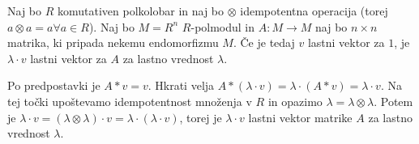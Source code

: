 \documentclass[mat1]{fmfdelo}
\newcommand{\pojem}[1]{\ensuremath{\emph{#1}}}
\newcommand{\map}[3]{\ensuremath{{#1}:{#2}\rightarrow{#3}}}
\begin{document}
\begin{trditev}
Naj bo $R$ komutativen polkolobar in naj bo $\otimes$ idempotentna operacija (torej $a\otimes a = a \forall a\in R$). Naj bo $M=R^n$ $R$-polmodul in $\map{A}{M}{M}$ naj bo $n\times n$ matrika, ki pripada nekemu endomorfizmu $M$. Če je tedaj $v$ lastni vektor za $1$, je $\lambda\cdot v$ lastni vektor za $A$ za lastno vrednost $\lambda$.
\end{trditev}
\begin{dokaz}
	Po predpostavki je $A*v = v$. Hkrati velja $A*(\lambda\cdot v) = \lambda\cdot (A*v) = \lambda\cdot v$. Na tej točki upoštevamo idempotentnost množenja v $R$ in opazimo $\lambda = \lambda\otimes\lambda$. Potem je $\lambda\cdot v = (\lambda\otimes\lambda)\cdot v = \lambda \cdot (\lambda\cdot v)$, torej je $\lambda\cdot v$ lastni vektor matrike $A$ za lastno vrednost $\lambda$.
\end{dokaz}

%
%	
%	
%	
\end{document}
